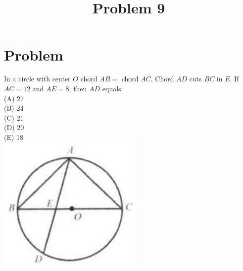 \documentclass{article}
\title{Problem 9}
\date{}
\begin{document}
\maketitle

\section*{Problem}
In a circle with center \(O\) chord \(A B=\) chord \(A C\). Chord \(A D\) cuts \(B C\) in \(E\). If \(A C=12\) and \(A E=8\), then \(A D\) equals:\\
(A) 27\\
(B) 24\\
(C) 21\\
(D) 20\\
(E) 18\\
\centering
\includegraphics[width=\textwidth]{images/170.jpg}
\end{document}
